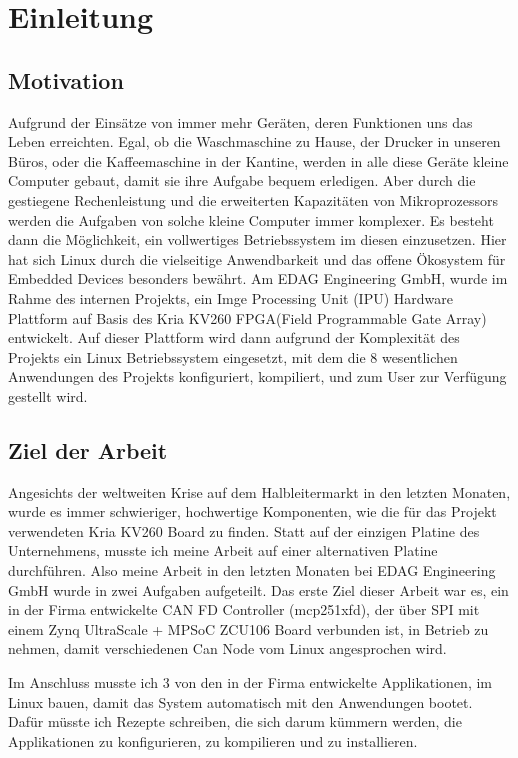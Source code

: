 \chapter{Einleitung}
\label{cha:Einleitung}

\section{Motivation}
\label{sec:Einl:Motivation}

Aufgrund der Einsätze von immer mehr Geräten, deren Funktionen uns das Leben erreichten. Egal, ob die Waschmaschine zu Hause, der Drucker in unseren Büros, oder die Kaffeemaschine in der Kantine, werden in alle diese Geräte kleine Computer gebaut, damit sie ihre Aufgabe bequem erledigen. Aber durch die gestiegene Rechenleistung und die erweiterten Kapazitäten von Mikroprozessors werden die Aufgaben von solche kleine Computer immer komplexer. Es besteht dann die Möglichkeit, ein vollwertiges Betriebssystem im diesen einzusetzen. Hier hat sich Linux durch die vielseitige Anwendbarkeit und das offene Ökosystem für Embedded Devices besonders bewährt. 
Am EDAG Engineering GmbH, wurde im Rahme des internen Projekts, ein Imge Processing Unit (IPU) Hardware Plattform auf Basis des Kria KV260 FPGA(Field Programmable Gate Array) entwickelt.  Auf dieser Plattform wird dann aufgrund der Komplexität des Projekts ein Linux Betriebssystem eingesetzt, mit dem die 8 wesentlichen Anwendungen des Projekts konfiguriert, kompiliert, und zum User zur Verfügung gestellt wird. 

\section{Ziel der Arbeit}
\label{sec:Einl:Ziel_der_Arbeit}

Angesichts der weltweiten Krise auf dem Halbleitermarkt in den letzten Monaten, wurde es immer schwieriger, hochwertige Komponenten, wie die für das Projekt verwendeten Kria KV260 Board zu finden. Statt auf der einzigen Platine des Unternehmens, musste ich meine Arbeit auf einer alternativen Platine durchführen. Also meine Arbeit in den letzten Monaten bei EDAG Engineering GmbH wurde in zwei Aufgaben aufgeteilt.
Das erste Ziel dieser Arbeit war es, ein in der Firma entwickelte CAN FD Controller (mcp251xfd), der über SPI mit einem Zynq UltraScale + MPSoC ZCU106 Board verbunden ist, in Betrieb zu nehmen, damit verschiedenen Can Node vom Linux angesprochen wird. 

Im Anschluss musste ich 3 von den in der Firma entwickelte Applikationen, im Linux bauen, damit das System automatisch mit den Anwendungen bootet. Dafür müsste ich Rezepte schreiben, die sich darum kümmern werden, die Applikationen zu konfigurieren, zu kompilieren und zu installieren. 

